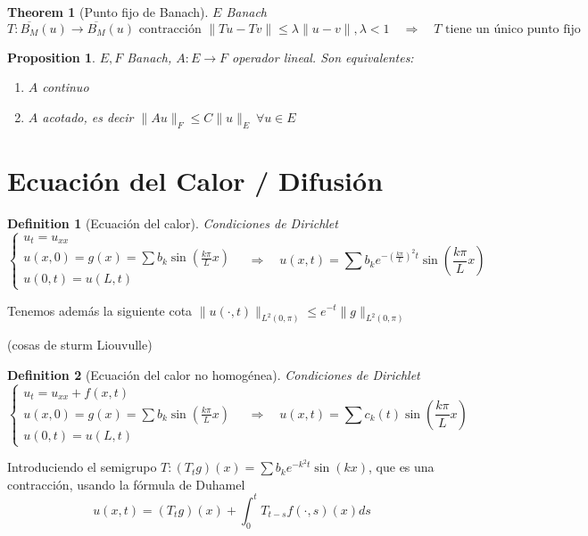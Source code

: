 \documentclass[leqno]{article}
\newtheorem*{theorem}{Theorem}
\newtheorem*{proposition}{Proposition}
\newtheorem*{definition}{Definition}
\begin{document}
\begin{theorem}[Punto fijo de Banach] $E$ Banach
 \[
T:\overline{B_M}(u) \to   \overline{B_M}(u) \text{ contracción } \|Tu-Tv\|\le \lambda \|u-v\|, \lambda<1 \quad \Rightarrow \quad T  \text{ tiene un único punto fijo}
\] 
\end{theorem}

\begin{proposition} $E, F$ Banach,  $A:E\to F$ operador lineal. Son equivalentes:
\begin{enumerate}[topsep=-6pt, itemsep=0pt]
  \item $A$ continuo
  \item  $A$ acotado, es decir  $\|Au\|_{F}\le C\|u\|_E \ \forall u\in E$ 
\end{enumerate} 
\end{proposition}

\section{Ecuación del Calor / Difusión}
\begin{definition}[Ecuación del calor] Condiciones de Dirichlet
\[
\begin{cases}
  u_t = u_{x x}\\
  u(x,0) = g(x) = \sum b_k \sin(\frac{k\pi}{L}x)\\
  u(0,t) = u(L, t)
\end{cases} \quad \Rightarrow \quad 
u(x, t) = \sum b_ke^{-( \frac{k\pi}{L})^2t}\sin\left( \frac{k\pi}{L} x\right)
\] 
\end{definition}

Tenemos además la siguiente cota $\|u(\cdot, t)\|_{L^2(0,\pi)}\le e^{-t}\|g\|_{L^2(0,\pi)}$

(cosas de sturm Liouvulle)

\begin{definition}[Ecuación del calor no homogénea] Condiciones de Dirichlet
\[
\begin{cases}
  u_t = u_{x x}+f(x,t)\\
  u(x,0) = g(x) = \sum b_k \sin(\frac{k\pi}{L}x)\\
  u(0,t) = u(L, t)
\end{cases} \quad \Rightarrow \quad u(x,t) = \sum c_k(t)\sin(\frac{k\pi}{L} x)
\] 
\end{definition}

Introduciendo el semigrupo $T: (T_tg)(x) = \sum b_k e^{-k^2t}\sin(kx)$, que es una contracción, usando la fórmula de Duhamel
\[
  u(x,t) = (T_tg)(x) + \int_0^t T_{t-s}f(\cdot, s)(x)ds
\] 
\end{document}
